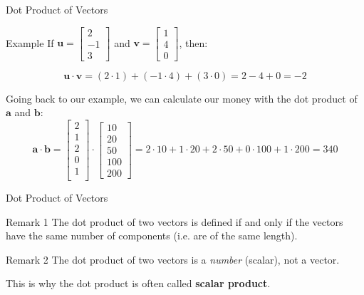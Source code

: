\documentclass{beamer}
\begin{document}
\begin{frame}{Dot Product of Vectors}
  \begin{exampleblock}{Example}
    If \( \mathbf{u} = \begin{bmatrix} 2 \\ -1 \\ 3 \end{bmatrix} \) and \( \mathbf{v} = \begin{bmatrix} 1 \\ 4 \\ 0 \end{bmatrix} \), then:

    \[
    \mathbf{u} \cdot \mathbf{v} = (2 \cdot 1) + (-1 \cdot 4) + (3 \cdot 0) = 2 - 4 + 0 = -2
    \]
  \end{exampleblock}
\pause Going back to our example, we can calculate our money with the dot product of $\mathbf{a}$ and $ \mathbf{b}$:
$$\mathbf{a} \cdot \mathbf{b}= \begin{bmatrix}
2 \\1 \\2 \\0 \\1 \\
\end{bmatrix}\cdot \begin{bmatrix}
10 \\ 20 \\ 50 \\ 100 \\ 200
\end{bmatrix} = 2 \cdot 10 + 1 \cdot 20 + 2 \cdot 50 + 0 \cdot 100 + 1\cdot 200 = 340$$

\end{frame}


\begin{frame}{Dot Product of Vectors}
  \begin{block}{Remark 1}
    The dot product of two vectors is defined if and only if the vectors have the same number of components (i.e. are of the same length).
  \end{block}

  \begin{block}{Remark 2}
    The dot product of two vectors is a \textit{number} (scalar), not a vector.
  \end{block}

  \pause This is why the dot product is often called \textbf{scalar product}.

\end{frame}
\end{document}
